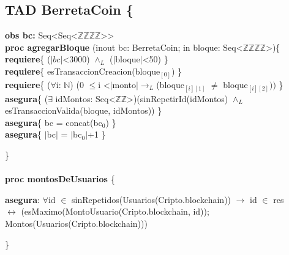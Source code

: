 \documentclass{article}
\begin{document}
\thispagestyle{empty}

\newpage %
\setcounter{page}{1}
\subsection*{TAD \textdollar BerretaCoin \{}
    \textbf{obs bc:} Seq\textless Seq\textless$\mathds{Z}$\texttimes$\mathds{Z}$\texttimes$\mathds{Z}$\texttimes$\mathds{Z}$\textgreater\textgreater\\

    \textbf{proc agregarBloque} (inout bc: \textdollar BerretaCoin;
                                in bloque: Seq\textless$\mathds{Z}$\texttimes$\mathds{Z}$\texttimes$\mathds{Z}$\texttimes$\mathds{Z}$\textgreater)\{
        \indent\indent \textbf{requiere}\{ ($|bc|$\textless3000) $\land_L$ ($|$bloque$|$\textless50) \}\\
        \indent\indent \textbf{requiere}\{ esTransaccionCreacion(bloque$_{[0]}$) \}\\
        \indent\indent \textbf{requiere}\{ ($\forall$i: $\mathds{N}$)
                                (0 $\leq$i \textless $|$monto$|\rightarrow_L$(bloque$_{[i][1]}$ $\neq$ bloque$_{[i][2]}))$ \}\\
        \indent\indent \textbf{asegura}\{ ($\exists$ idMontos: Seq\textless$\mathds{Z}$\texttimes$\mathds{Z}$\textgreater)(sinRepetirId(idMontos) $\land_L$\\
        \indent\indent\indent\indent\indent esTransaccionValida(bloque, idMontos)) \}\\
        \indent\indent \textbf{asegura}\{ bc = concat(bc$_0$) \}\\
        \indent\indent \textbf{asegura}\{ $|$bc$|$ = $|$bc$_0|$+1 \}

    \}\\\\

    \textbf{proc montosDeUsuarios} \{

        \indent\indent \textbf{asegura}: $\forall$id $\in$ sinRepetidos(Usuarios(Cripto.blockchain)) $\rightarrow$ id $\in$ res\\
        \indent\indent\indent\indent\indent $\longleftrightarrow$ (esMaximo(MontoUsuario(Cripto.blockchain, id));\\
        \indent\indent\indent\indent\indent Montos(Usuarios(Cripto.blockchain)))

    \}\\\\
\end{document}
